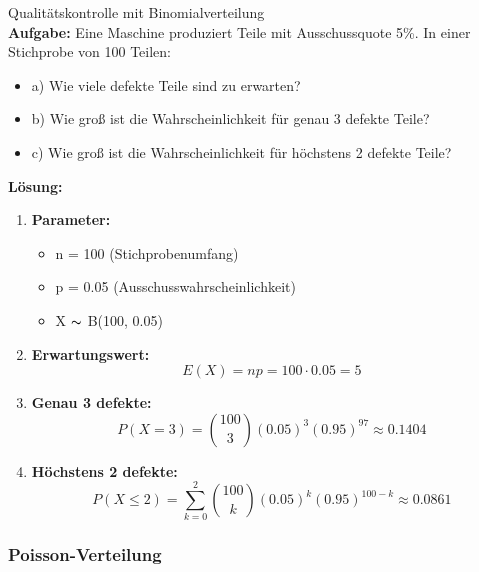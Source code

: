 \begin{example}{Qualitätskontrolle mit Binomialverteilung}\\
\textbf{Aufgabe:} Eine Maschine produziert Teile mit Ausschussquote 5\%. In einer Stichprobe von 100 Teilen:
\begin{itemize}
\item a) Wie viele defekte Teile sind zu erwarten?
\item b) Wie groß ist die Wahrscheinlichkeit für genau 3 defekte Teile?
\item c) Wie groß ist die Wahrscheinlichkeit für höchstens 2 defekte Teile?
\end{itemize}

\textbf{Lösung:}
\begin{enumerate}
\item \textbf{Parameter:}
   \begin{itemize}
   \item n = 100 (Stichprobenumfang)
   \item p = 0.05 (Ausschusswahrscheinlichkeit)
   \item X $\thicksim$ B(100, 0.05)
   \end{itemize}

\item \textbf{Erwartungswert:}
   $$E(X) = np = 100 \cdot 0.05 = 5$$

\item \textbf{Genau 3 defekte:}
   $$P(X=3) = \binom{100}{3}(0.05)^3(0.95)^{97} \approx 0.1404$$

\item \textbf{Höchstens 2 defekte:}
   $$P(X \leq 2) = \sum_{k=0}^2 \binom{100}{k}(0.05)^k(0.95)^{100-k} \approx 0.0861$$
\end{enumerate}
\end{example}

\subsubsection{Poisson-Verteilung}



